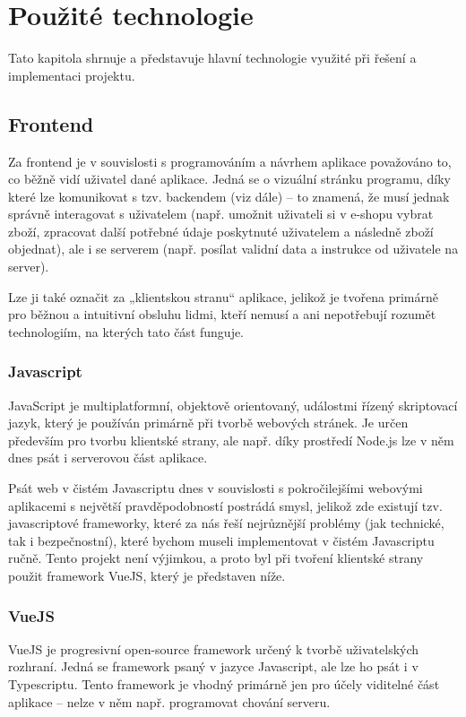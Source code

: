 \chapter{Použité technologie}
Tato kapitola shrnuje a představuje hlavní technologie využité při řešení a implementaci projektu.

\section{Frontend}
Za frontend je v souvislosti s programováním a návrhem aplikace považováno to, co běžně vidí uživatel dané aplikace. Jedná se o vizuální stránku programu, díky které lze komunikovat s tzv. backendem (viz dále) – to znamená, že musí jednak správně interagovat s uživatelem (např. umožnit uživateli si v e-shopu vybrat zboží, zpracovat další potřebné údaje poskytnuté uživatelem a následně zboží objednat), ale i se serverem (např. posílat validní data a instrukce od uživatele na server).

Lze ji také označit za „klientskou stranu“ aplikace, jelikož je tvořena primárně pro běžnou a intuitivní obsluhu lidmi, kteří nemusí a ani nepotřebují rozumět technologiím, na kterých tato část funguje. \cite{FEvsBE}

	\subsection{Javascript}
	JavaScript je multiplatformní, objektově orientovaný, událostmi řízený skriptovací jazyk, který je používán primárně při tvorbě webových stránek. Je určen především pro tvorbu klientské strany, ale např. díky prostředí Node.js lze v něm dnes psát i serverovou část aplikace. \cite{JS1} \cite{JS2}
	
	Psát web v čistém Javascriptu dnes v souvislosti s pokročilejšími webovými aplikacemi s největší pravděpodobností postrádá smysl, jelikož zde existují tzv. javascriptové frameworky, které za nás řeší nejrůznější problémy (jak technické, tak i bezpečnostní), které bychom museli implementovat v čistém Javascriptu ručně. Tento projekt není výjimkou, a proto byl při tvoření klientské strany použit framework VueJS, který je představen níže.
	
	\subsection{VueJS}
	VueJS je progresivní open-source framework určený k tvorbě uživatelských rozhraní. Jedná se framework psaný v jazyce Javascript, ale lze ho psát i v Typescriptu. Tento framework je vhodný primárně jen pro účely viditelné část aplikace – nelze v něm např. programovat chování serveru. \cite{VueJS1}
	
